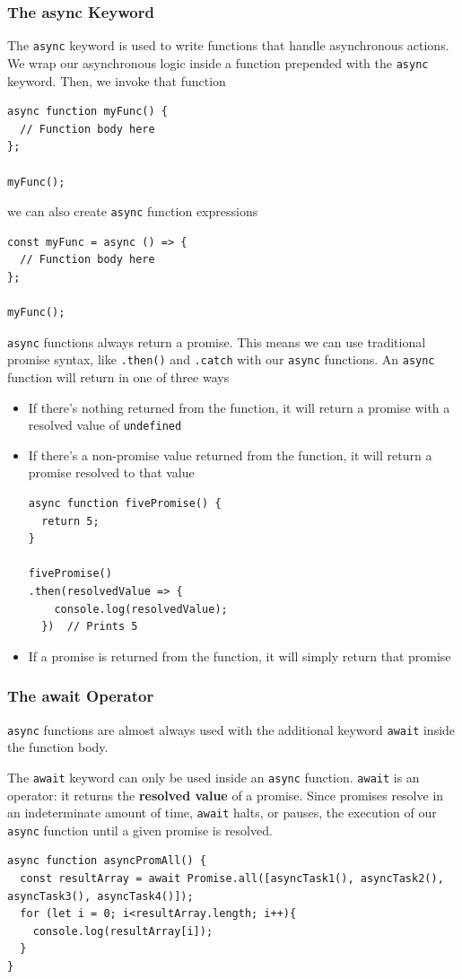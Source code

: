 \documentclass[a4paper, 12pt]{article}
\begin{document}
\subsubsection{The async Keyword}
The \verb|async| keyword is used to write functions that handle asynchronous actions. We wrap our asynchronous logic inside a function prepended with the \verb|async| keyword. Then, we invoke that function
\begin{verbatim}
async function myFunc() {
  // Function body here
};

myFunc();
\end{verbatim}
we can also create \verb|async| function expressions
\begin{verbatim}
const myFunc = async () => {
  // Function body here
};

myFunc();
\end{verbatim}
\verb|async| functions always return a promise. This means we can use traditional promise syntax, like \verb|.then()| and \verb|.catch| with our \verb|async| functions. An \verb|async| function will return in one of three ways
\begin{itemize}
\item If there's nothing returned from the function, it will return a promise with a resolved value of \verb|undefined|
\item If there's a non-promise value returned from the function, it will return a promise resolved to that value
\begin{verbatim}
async function fivePromise() { 
  return 5;
}

fivePromise()
.then(resolvedValue => {
    console.log(resolvedValue);
  })  // Prints 5
\end{verbatim}

\item If a promise is returned from the function, it will simply return that promise
\end{itemize}

\subsubsection{The await Operator}
\verb|async| functions are almost always used with the additional keyword \verb|await| inside the function body.

The \verb|await| keyword can only be used inside an \verb|async| function. \verb|await| is an operator: it returns the \textbf{resolved value} of a promise. Since promises resolve in an indeterminate amount of time, \verb|await| halts, or pauses, the execution of our \verb|async| function until a given promise is resolved.
\begin{verbatim}
async function asyncPromAll() {
  const resultArray = await Promise.all([asyncTask1(), asyncTask2(), 
asyncTask3(), asyncTask4()]);
  for (let i = 0; i<resultArray.length; i++){
    console.log(resultArray[i]); 
  }
}
\end{verbatim}
\end{document}
